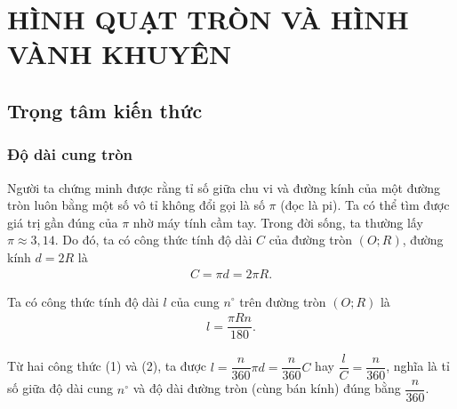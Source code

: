 \setcounter{section}{3}
\section{HÌNH QUẠT TRÒN VÀ HÌNH VÀNH KHUYÊN}
\subsection{Trọng tâm kiến thức}
\begin{tomtat}
\subsubsection{Độ dài cung tròn}
\begin{boxdl}
	Người ta chứng minh được rằng tỉ số giữa chu vi và đường kính của một đường tròn luôn bằng một số vô tỉ không đổi gọi là số $\pi$ (đọc là pi). Ta có thể tìm được giá trị gần đúng của $\pi$ nhờ máy tính cầm tay. Trong đời sống, ta thường lấy $\pi \approx 3{,}14$.
	Do đó, ta có công thức tính độ dài $C$ của đường tròn $(O;R)$, đường kính $d=2R$ là
	\begin{align}
	C=\pi d=2 \pi R.\tag{1}
	\end{align}
\end{boxdl}
\begin{boxdl}
	Ta có công thức tính độ dài $l$ của cung $n^{\circ}$ trên đường tròn $(O;R)$ là
	\begin{align}
	l=\dfrac{\pi Rn}{180}.\tag{2}
	\end{align}
\end{boxdl}
\begin{nx}
	Từ hai công thức (1) và (2), ta được $l=\dfrac{n}{360} \pi d=\dfrac{n}{360} C$ hay $\dfrac{l}{C}=\dfrac{n}{360}$, nghĩa là tỉ số giữa độ dài cung $n^{\circ}$ và độ dài đường tròn (cùng bán kính) đúng bằng $\dfrac{n}{360}$.
\end{nx}

\end{tomtat}
